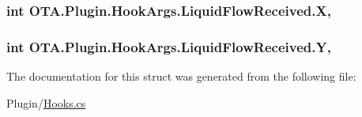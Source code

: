 \subsubsection[{X}]{\setlength{\rightskip}{0pt plus 5cm}int O\+T\+A.\+Plugin.\+Hook\+Args.\+Liquid\+Flow\+Received.\+X\hspace{0.3cm}{\ttfamily [get]}, {\ttfamily [set]}}\label{struct_o_t_a_1_1_plugin_1_1_hook_args_1_1_liquid_flow_received_aecd7b461faba26aea1b3ae2b38831036}
\hypertarget{struct_o_t_a_1_1_plugin_1_1_hook_args_1_1_liquid_flow_received_a8ec627eed0854f721600fdfeb07ba8cd}{}
\subsubsection[{Y}]{\setlength{\rightskip}{0pt plus 5cm}int O\+T\+A.\+Plugin.\+Hook\+Args.\+Liquid\+Flow\+Received.\+Y\hspace{0.3cm}{\ttfamily [get]}, {\ttfamily [set]}}\label{struct_o_t_a_1_1_plugin_1_1_hook_args_1_1_liquid_flow_received_a8ec627eed0854f721600fdfeb07ba8cd}


The documentation for this struct was generated from the following file\+:\begin{DoxyCompactItemize}
\item 
Plugin/\hyperlink{_hooks_8cs}{Hooks.\+cs}\end{DoxyCompactItemize}
